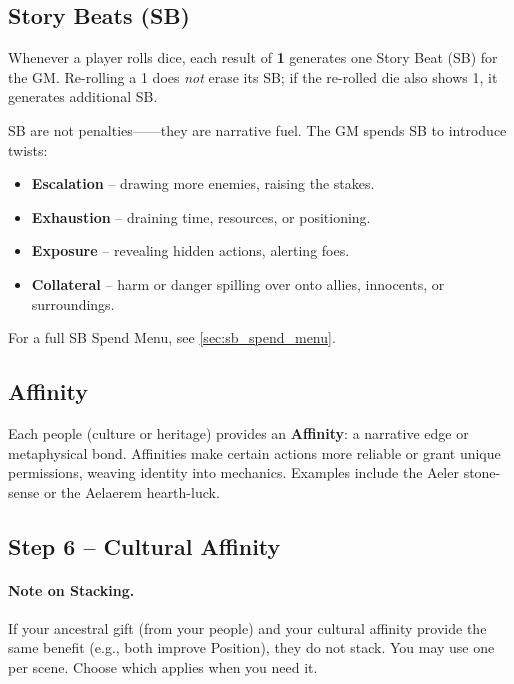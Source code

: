 \subsection{Story Beats (SB)}\label{subsec:story_beats}

Whenever a player rolls dice, each result of \textbf{1} generates one Story Beat (SB) for the GM. Re-rolling a 1 does \textit{not} erase its SB; if the re-rolled die also shows 1, it generates additional SB.

SB are not penalties------they are narrative fuel. The GM spends SB to introduce twists:

\begin{itemize}
\item \textbf{Escalation} -- drawing more enemies, raising the stakes.
\item \textbf{Exhaustion} -- draining time, resources, or positioning.
\item \textbf{Exposure} -- revealing hidden actions, alerting foes.
\item \textbf{Collateral} -- harm or danger spilling over onto allies, innocents, or surroundings.
\end{itemize}

For a full SB Spend Menu, see \ref{sec:sb_spend_menu}.

\subsection{Affinity}\label{subsec:affinity}

Each people (culture or heritage) provides an \textbf{Affinity}: a narrative edge or metaphysical bond. Affinities make certain actions more reliable or grant unique permissions, weaving identity into mechanics. Examples include the Aeler stone-sense or the Aelaerem hearth-luck.

\subsection{Step 6 -- Cultural Affinity}

\paragraph{Note on Stacking.}
If your ancestral gift (from your people) and your cultural affinity provide 
the same benefit (e.g., both improve Position), they do not stack. You may 
use one per scene. Choose which applies when you need it.

